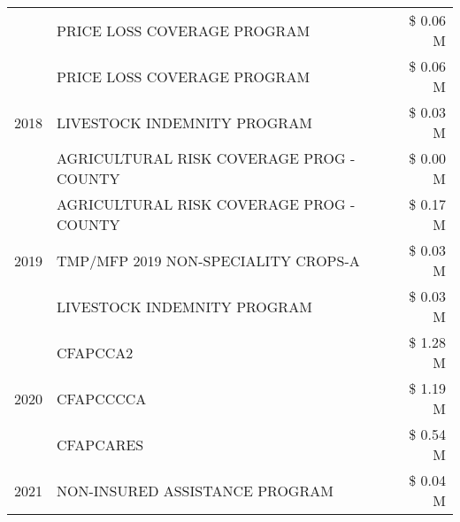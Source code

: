 \begin{tabular}{llr}
 & PRICE LOSS COVERAGE PROGRAM & \$ 0.06 M \\
\cline{1-3}
\multirow[t]{3}{*}{2018} & PRICE LOSS COVERAGE PROGRAM & \$ 0.06 M \\
 & LIVESTOCK INDEMNITY PROGRAM & \$ 0.03 M \\
 & AGRICULTURAL RISK COVERAGE PROG - COUNTY & \$ 0.00 M \\
\cline{1-3}
\multirow[t]{3}{*}{2019} & AGRICULTURAL RISK COVERAGE PROG - COUNTY & \$ 0.17 M \\
 & TMP/MFP 2019 NON-SPECIALITY CROPS-A & \$ 0.03 M \\
 & LIVESTOCK INDEMNITY PROGRAM & \$ 0.03 M \\
\cline{1-3}
\multirow[t]{3}{*}{2020} & CFAPCCA2 & \$ 1.28 M \\
 & CFAPCCCCA & \$ 1.19 M \\
 & CFAPCARES & \$ 0.54 M \\
\cline{1-3}
2021 & NON-INSURED ASSISTANCE PROGRAM & \$ 0.04 M \\
\cline{1-3}
\bottomrule
\end{tabular}
